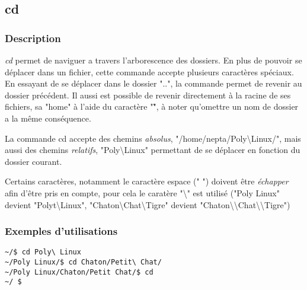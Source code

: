 \subsection{cd}
\subsubsection{Description}
\emph{cd} permet de naviguer a travers l'arborescence des dossiers.
En plus de pouvoir se déplacer dans un fichier, cette commande accepte plusieurs caractères spéciaux.
En essayant de se déplacer dans le dossier "..", la commande permet de revenir au dossier précédent.
Il aussi est possible de revenir directement à la racine de ses fichiers, sa "home" à l'aide du caractère "\~", à noter qu'omettre un nom de dossier a la même conséquence.

La commande cd accepte des chemins \emph{absolus}, "/home/nepta/Poly\textbackslash Linux/", mais aussi des chemins \emph{relatifs}, "Poly\textbackslash \textvisiblespace Linux" permettant de se déplacer en fonction du dossier courant.

Certains caractères, notamment le caractère espace (" ") doivent être \emph{échapper} afin d'être pris en compte, pour cela le caratère "\textbackslash" est utilisé ("Poly Linux" devient "Polyt\textbackslash Linux",
"Chaton\textbackslash Chat\textbackslash Tigre" devient "Chaton\textbackslash \textbackslash Chat\textbackslash \textbackslash Tigre")

\subsubsection{Exemples d'utilisations}

\begin{lstlisting}
~/$ cd Poly\ Linux
~/Poly Linux/$ cd Chaton/Petit\ Chat/
~/Poly Linux/Chaton/Petit Chat/$ cd
~/ $ 
\end{lstlisting}
